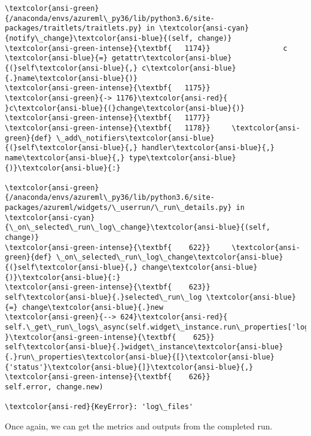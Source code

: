 \documentclass[11pt]{article}
\begin{document}
\begin{Verbatim}[commandchars=\\\{\}, frame=single, framerule=2mm, rulecolor=\color{outerrorbackground}]
\textcolor{ansi-green}{/anaconda/envs/azureml\_py36/lib/python3.6/site-packages/traitlets/traitlets.py} in \textcolor{ansi-cyan}{notify\_change}\textcolor{ansi-blue}{(self, change)}
\textcolor{ansi-green-intense}{\textbf{   1174}}                 c \textcolor{ansi-blue}{=} getattr\textcolor{ansi-blue}{(}self\textcolor{ansi-blue}{,} c\textcolor{ansi-blue}{.}name\textcolor{ansi-blue}{)}
\textcolor{ansi-green-intense}{\textbf{   1175}} 
\textcolor{ansi-green}{-> 1176}\textcolor{ansi-red}{             }c\textcolor{ansi-blue}{(}change\textcolor{ansi-blue}{)}
\textcolor{ansi-green-intense}{\textbf{   1177}} 
\textcolor{ansi-green-intense}{\textbf{   1178}}     \textcolor{ansi-green}{def} \_add\_notifiers\textcolor{ansi-blue}{(}self\textcolor{ansi-blue}{,} handler\textcolor{ansi-blue}{,} name\textcolor{ansi-blue}{,} type\textcolor{ansi-blue}{)}\textcolor{ansi-blue}{:}

\textcolor{ansi-green}{/anaconda/envs/azureml\_py36/lib/python3.6/site-packages/azureml/widgets/\_userrun/\_run\_details.py} in \textcolor{ansi-cyan}{\_on\_selected\_run\_log\_change}\textcolor{ansi-blue}{(self, change)}
\textcolor{ansi-green-intense}{\textbf{    622}}     \textcolor{ansi-green}{def} \_on\_selected\_run\_log\_change\textcolor{ansi-blue}{(}self\textcolor{ansi-blue}{,} change\textcolor{ansi-blue}{)}\textcolor{ansi-blue}{:}
\textcolor{ansi-green-intense}{\textbf{    623}}         self\textcolor{ansi-blue}{.}selected\_run\_log \textcolor{ansi-blue}{=} change\textcolor{ansi-blue}{.}new
\textcolor{ansi-green}{--> 624}\textcolor{ansi-red}{         self.\_get\_run\_logs\_async(self.widget\_instance.run\_properties['log\_files'],
}\textcolor{ansi-green-intense}{\textbf{    625}}                                  self\textcolor{ansi-blue}{.}widget\_instance\textcolor{ansi-blue}{.}run\_properties\textcolor{ansi-blue}{[}\textcolor{ansi-blue}{'status'}\textcolor{ansi-blue}{]}\textcolor{ansi-blue}{,}
\textcolor{ansi-green-intense}{\textbf{    626}}                                  self.error, change.new)

\textcolor{ansi-red}{KeyError}: 'log\_files'
    \end{Verbatim}

    Once again, we can get the metrics and outputs from the completed run.
\end{document}
